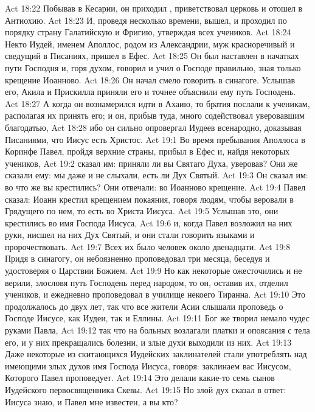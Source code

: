 \vs Act 18:22 Побывав в Кесарии, он приходил , приветствовал церковь и отошел в Антиохию.
\vs Act 18:23 И, проведя  несколько времени, вышел, и проходил по порядку страну Галатийскую и Фригию, утверждая всех учеников.
\rsbpar\vs Act 18:24 Некто Иудей, именем Аполлос, родом из Александрии, муж красноречивый и сведущий в Писаниях, пришел в Ефес.
\vs Act 18:25 Он был наставлен в начатках пути Господня и, горя духом, говорил и учил о Господе правильно, зная только крещение Иоанново.
\vs Act 18:26 Он начал смело говорить в синагоге. Услышав его, Акила и Прискилла приняли его и точнее объяснили ему путь Господень.
\vs Act 18:27 А когда он вознамерился идти в Ахаию, то братия послали к  ученикам, располагая их принять его; и он, прибыв туда, много содействовал уверовавшим благодатью,
\vs Act 18:28 ибо он сильно опровергал Иудеев всенародно, доказывая Писаниями, что Иисус есть Христос.
\vs Act 19:1 Во время пребывания Аполлоса в Коринфе Павел, пройдя верхние страны, прибыл в Ефес и, найдя  некоторых учеников,
\vs Act 19:2 сказал им: приняли ли вы Святаго Духа, уверовав? Они же сказали ему: мы даже и не слыхали, есть ли Дух Святый.
\vs Act 19:3 Он сказал им: во что же вы крестились? Они отвечали: во Иоанново крещение.
\vs Act 19:4 Павел сказал: Иоанн крестил крещением покаяния, говоря людям, чтобы веровали в Грядущего по нем, то есть во Христа Иисуса.
\vs Act 19:5 Услышав это, они крестились во имя Господа Иисуса,
\vs Act 19:6 и, когда Павел возложил на них руки, нисшел на них Дух Святый, и они стали говорить  языками и пророчествовать.
\vs Act 19:7 Всех их было человек около двенадцати.
\rsbpar\vs Act 19:8 Придя в синагогу, он небоязненно проповедовал три месяца, беседуя и удостоверяя о Царствии Божием.
\vs Act 19:9 Но как некоторые ожесточились и не верили, злословя путь Господень перед народом, то он, оставив их, отделил учеников, и ежедневно проповедовал в училище некоего Тиранна.
\vs Act 19:10 Это продолжалось до двух лет, так что все жители Асии слышали проповедь о Господе Иисусе, как Иудеи, так и Еллины.
\rsbpar\vs Act 19:11 Бог же творил немало чудес руками Павла,
\vs Act 19:12 так что на больных возлагали платки и опоясания с тела его, и у них прекращались болезни, и злые духи выходили из них.
\vs Act 19:13 Даже некоторые из скитающихся Иудейских заклинателей стали употреблять над имеющими злых духов имя Господа Иисуса, говоря: заклинаем вас Иисусом, Которого Павел проповедует.
\vs Act 19:14 Это делали какие-то семь сынов Иудейского первосвященника Скевы.
\vs Act 19:15 Но злой дух сказал в ответ: Иисуса знаю, и Павел мне известен, а вы кто?
